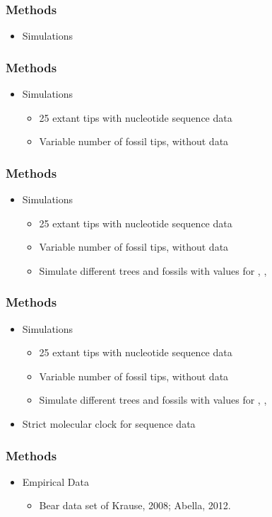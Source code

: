 \documentclass[]{beamer}
\begin{document}
\begin{frame}
\frametitle{Methods}
\begin{itemize}
\item Simulations
\end{itemize}
\end{frame}

\begin{frame}
\frametitle{Methods}
\begin{itemize}
\item Simulations
\begin{itemize}
\item 25 extant tips with nucleotide sequence data
\item Variable number of fossil tips, without data
\end{itemize}
\end{itemize}
\end{frame}

\begin{frame}
\frametitle{Methods}
\begin{itemize}
\item Simulations
\begin{itemize}
\item 25 extant tips with nucleotide sequence data
\item Variable number of fossil tips, without data
\item Simulate different trees and fossils with values for \lambda, \mu ,  \psi
\end{itemize}
\end{itemize}
\end{frame}

\begin{frame}
\frametitle{Methods}
\begin{itemize}
\item Simulations
\begin{itemize}
\item 25 extant tips with nucleotide sequence data
\item Variable number of fossil tips, without data
\item Simulate different trees and fossils with values for \lambda, \mu ,  \psi
\end{itemize}
\item Strict molecular clock for sequence data
\end{itemize}
\end{frame}

\begin{frame}
\frametitle{Methods}
\begin{itemize}
\item Empirical Data
\begin{itemize}
\item Bear data set of Krause, 2008; Abella, 2012.
\end{itemize}
\end{itemize}
\end{frame}
\end{document}
